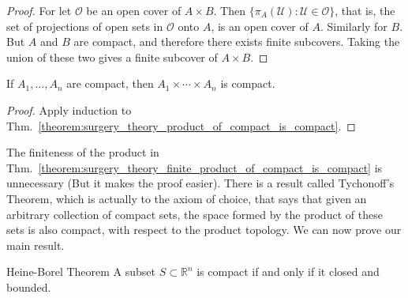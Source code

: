\documentclass[crop=false,class=book,oneside]{standalone}
\begin{document}
            \begin{proof}
                For let $\mathcal{O}$ be an open cover
                of $A\times{B}$.  Then
                $\{\pi_{A}(\mathcal{U}):\mathcal{U}\in\mathcal{O}\}$,
                that is, the set of projections of open sets in
                $\mathcal{O}$ onto $A$, is an open cover of $A$.
                Similarly for $B$. But $A$ and $B$ are compact, and
                therefore there exists finite subcovers. Taking the
                union of these two gives
                a finite subcover of $A\times{B}$.
            \end{proof}
            \begin{theorem}
                \label{theorem:surgery_theory_finite_product_of_compact_is_compact}
                If $A_{1},\hdots,A_{n}$ are compact,
                then $A_{1}\times\cdots\times{A_{n}}$ is compact.
            \end{theorem}
            \begin{proof}
                Apply induction to
                Thm.~\ref{theorem:surgery_theory_product_of_compact_is_compact}.
            \end{proof}
            The finiteness of the product in
            Thm.~\ref{theorem:surgery_theory_finite_product_of_compact_is_compact}
            is unnecessary (But it makes the proof easier). There
            is a result called Tychonoff's Theorem, which is
            actually to the axiom of choice, that
            says that given an arbitrary collection of compact sets,
            the space formed by the product of these sets is also
            compact, with respect to the product topology.
            We can now prove our main result.
            \begin{ftheorem}{Heine-Borel Theorem}{}
                \label{theorem:surgery_theory_Heine_Borel}
                A subset $S\subset\mathbb{R}^{n}$ is compact if
                and only if it closed and bounded.
            \end{ftheorem}
\end{document}
